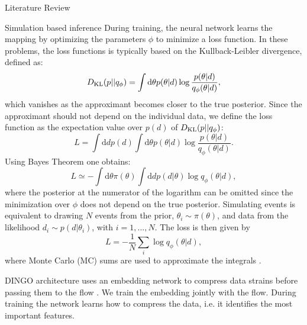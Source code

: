 \documentclass[a4paper, 12pt, twoside, openright, titlepage]{book}
\begin{document}
\begin{chapter}{Literature Review}
\begin{section}{Simulation based inference}
During training, the neural network learns the mapping by optimizing the parameters $\phi$ to minimize a loss function.
In these problems, the loss functions is typically based on the Kullback-Leibler divergence, defined as:
\begin{equation}
D_{\rm KL}(p||q_{\phi}) = \int \textrm{d}\theta p(\theta|d) \log{\frac{p(\theta|d)}{q_{\phi}(\theta|d)}},
\end{equation}
which vanishes as the approximant becomes closer to the true posterior.
Since the approximant should not depend on the individual data, we define the loss function as the expectation value over $p(d)$ of $D_{\rm KL}(p||q_{\phi})$:
\begin{equation}
L  = \int \textrm{d}{d}p(d)\int \textrm{d}\theta p(\theta|d) \log{\frac{p(\theta|d)}{q_{\phi}(\theta|d)}}.
\end{equation}
Using Bayes Theorem one obtains:
\begin{equation}
L  \simeq - \int \textrm{d}\theta \pi(\theta) \int\textrm{d}{d} p(d|\theta)\log{q_{\phi}(\theta|d)}, 
\end{equation}
where the posterior at the numerator of the logarithm can be omitted since the minimization over $\phi$ does not depend on the true posterior.
Simulating events is equivalent to drawing $N$ events from the prior, $\theta_{i}\sim \pi(\theta)$, and data from the likelihood $d_{i} \sim p(d|\theta_{i})$, with $i=1,...,N$.
The loss is then given by
\begin{equation}
L = - \frac{1}{N} \sum_{i} \log{q_{\phi}(\theta|d)},
\end{equation}
where Monte Carlo (MC) sums are used to approximate the integrals \cite{10.5555/2578955}.

DINGO architecture uses an embedding network to compress data strains before passing them to the flow \cite{2021PhRvL.127x1103D}. 
We train the embedding jointly with the flow. 
During training the network learns how to compress the data, i.e. it identifies the most important features.

\end{section}














\end{chapter}
\end{document}
